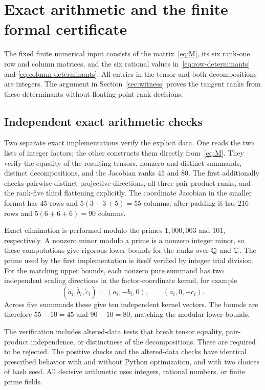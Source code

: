 \section{Exact arithmetic and the finite formal certificate}
\label{sec:verification}

The fixed finite numerical input consists of
the matrix~\eqref{eq:M}, its six rank-one row and column matrices,
and the six rational values in~\eqref{eq:row-determinants} and
\eqref{eq:column-determinants}. All entries in the tensor and both
decompositions are integers. The argument in Section~\ref{sec:witness}
proves the tangent ranks from these determinants without floating-point
rank decisions.

\subsection{Independent exact arithmetic checks}

Two separate exact implementations verify the explicit data. One reads
the two lists of integer factors; the other constructs them directly
from~\eqref{eq:M}. They verify the equality of the resulting tensors,
nonzero and distinct summands, distinct decompositions, and the Jacobian
ranks $45$ and $80$. The first additionally checks pairwise distinct
projective directions, all three pair-product ranks, and the rank-five
third flattening explicitly.
The coordinate Jacobian in the smaller format has $45$ rows and
$5(3+3+5)=55$ columns; after padding it has $216$ rows and
$5(6+6+6)=90$ columns.

Exact elimination is performed modulo the primes $1{,}000{,}003$ and
$101$, respectively. A nonzero minor modulo a prime is a nonzero
integer minor, so these computations give rigorous lower bounds for
the ranks over $\mathbb Q$ and $\mathbb C$. The prime used by the first implementation
is itself verified by integer trial division. For the matching upper
bounds, each nonzero pure summand has two independent scaling
directions in the factor-coordinate kernel, for example
\[
 (\dot a_i,\dot b_i,\dot c_i)=(a_i,-b_i,0),
 \qquad (a_i,0,-c_i).
\]
Across five summands these give ten independent kernel vectors.
The bounds are therefore $55-10=45$ and $90-10=80$, matching the
modular lower bounds.

The verification includes altered-data tests that break tensor equality,
pair-product independence, or distinctness of the decompositions.
These are required to be rejected. The positive checks and the
altered-data checks have identical prescribed behavior with and without
Python optimization, and with two choices of hash seed. All decisive
arithmetic uses integers, rational numbers, or finite prime fields.

